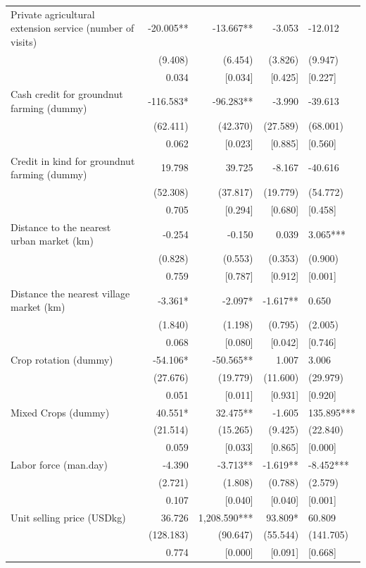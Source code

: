 \documentclass[
]{article}
\begin{document}
\begin{ThreePartTable}
\begin{longtable}[t]{lrrrl}
Private agricultural extension service (number of visits) & -20.005** & -13.667** & -3.053 & -12.012\\
 & (9.408) & (6.454) & (3.826) & (9.947)\\
 & 0.034 & {}[0.034] & {}[0.425] & {}[0.227]\\
Cash credit for groundnut farming (dummy) & -116.583* & -96.283** & -3.990 & -39.613\\
 & (62.411) & (42.370) & (27.589) & (68.001)\\
 & 0.062 & {}[0.023] & {}[0.885] & {}[0.560]\\
Credit in kind for groundnut farming (dummy) & 19.798 & 39.725 & -8.167 & -40.616\\
 & (52.308) & (37.817) & (19.779) & (54.772)\\
 & 0.705 & {}[0.294] & {}[0.680] & {}[0.458]\\
Distance to the nearest urban market (km) & -0.254 & -0.150 & 0.039 & 3.065***\\
 & (0.828) & (0.553) & (0.353) & (0.900)\\
 & 0.759 & {}[0.787] & {}[0.912] & {}[0.001]\\
Distance the nearest village market (km) & -3.361* & -2.097* & -1.617** & 0.650\\
 & (1.840) & (1.198) & (0.795) & (2.005)\\
 & 0.068 & {}[0.080] & {}[0.042] & {}[0.746]\\
Crop rotation (dummy) & -54.106* & -50.565** & 1.007 & 3.006\\
 & (27.676) & (19.779) & (11.600) & (29.979)\\
 & 0.051 & {}[0.011] & {}[0.931] & {}[0.920]\\
Mixed Crops (dummy) & 40.551* & 32.475** & -1.605 & 135.895***\\
 & (21.514) & (15.265) & (9.425) & (22.840)\\
 & 0.059 & {}[0.033] & {}[0.865] & {}[0.000]\\
Labor force (man.day) & -4.390 & -3.713** & -1.619** & -8.452***\\
 & (2.721) & (1.808) & (0.788) & (2.579)\\
 & 0.107 & {}[0.040] & {}[0.040] & {}[0.001]\\
Unit selling price (USD\/kg) & 36.726 & 1,208.590*** & 93.809* & 60.809\\
 & (128.183) & (90.647) & (55.544) & (141.705)\\
 & 0.774 & {}[0.000] & {}[0.091] & {}[0.668]\\

\end{longtable}
\end{ThreePartTable}
\end{document}
